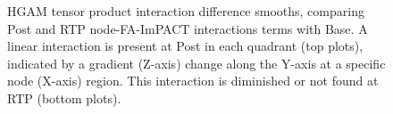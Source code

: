 \documentclass[12pt]{article}
\begin{document}
\begin{figure}[H]
	\caption{}
\end{figure}
\clearpage
\begin{figure}
	\captionsetup{labelformat=adja-page}
	\ContinuedFloat
	\caption{HGAM tensor product interaction difference smooths, comparing Post and RTP node-FA-ImPACT interactions terms with Base. A linear interaction is present at Post in each quadrant (top plots), indicated by a gradient (Z-axis) change along the Y-axis at a specific node (X-axis) region. This interaction is diminished or not found at RTP (bottom plots).}
	\label{fig:lgio-intx-imp}
\end{figure}
\end{document}
